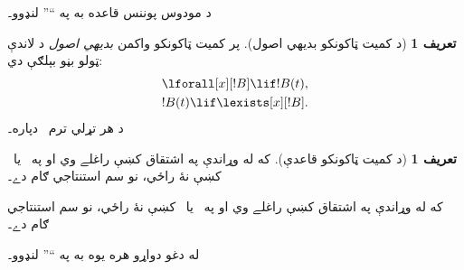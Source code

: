 \documentclass[12pt,a4paper,oneside]{report}
\renewcommand{\MP}{\LR{\latinfont MP}}
\renewcommand{\QR}{\LR{\latinfont QR}}
\newcommand{\olfileid}[3]{\gdef\pspart{#1}\gdef\pschapter{#2}\gdef\pssection{#3}}
\gdef\pspart{#2}\gdef\pschapter{#3}\gdef\pssection{}%
\newcommand{\ollabel}[1]{\label{\pspart:\pschapter:\pssection:#1}}
\theoremstyle{definition}
\newtheorem{defn}[thm]{تعريف}
\begin{document}
\label{olpseg:OLP-0114-B008:start}
د مودوس پوننس قاعده به په ``\MP'' لنډوو۔
\label{olpseg:OLP-0114-B008:end}

\label{olpseg:OLP-0115-B004:start}
\olfileid{fol}{axd}{qua}
\label{olpseg:OLP-0115-B004:end}

\label{olpseg:OLP-0115-B005:start}
\label{olpseg:OLP-0115-B005:end}

\label{olpseg:OLP-0115-B006:start}
\begin{defn}[د کميت ټاکونکو بديهي اصول]
پر کميت ټاکونکو واکمن \emph{بديهي اصول} د لاندې ټولو بڼو بېلګې دي:
\begin{align}
\ollabel{ax:q1} & \lforall[x][!B] \lif !B(t), \\
\ollabel{ax:q2} & !B(t) \lif \lexists[x][!B].
\end{align}
د هر تړلي ترم~ دپاره۔
\end{defn}
\label{olpseg:OLP-0115-B006:end}

\label{olpseg:OLP-0115-B007:start}
\begin{defn}[د کميت ټاکونکو قاعدې]
\item که  له وړاندې په اشتقاق کښې راغلے وي
  او  په~\LR{$\Gamma$} يا~ کښې نۀ راځي، نو
   سم استنتاجي ګام دے۔
\item که  له وړاندې په اشتقاق کښې راغلے وي
  او  په~\LR{$\Gamma$} يا~ کښې نۀ راځي، نو
   سم استنتاجي ګام دے۔
\end{defn}
\label{olpseg:OLP-0115-B007:end}

\label{olpseg:OLP-0115-B008:start}
له دغو دواړو هره يوه به په ``\QR'' لنډوو۔
\label{olpseg:OLP-0115-B008:end}

\label{olpseg:OLP-0116-B004:start}
\olfileid{fol}{axd}{pro}
\label{olpseg:OLP-0116-B004:end}

\label{olpseg:OLP-0116-B005:start}
\label{olpseg:OLP-0116-B005:end}
\end{document}

